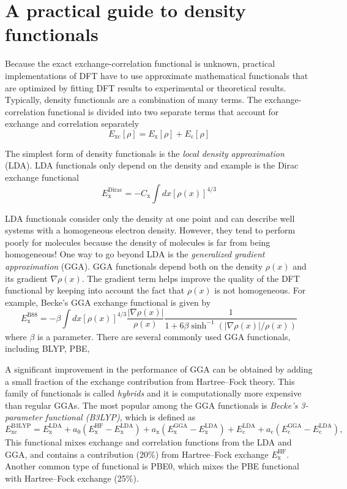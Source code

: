 \documentclass[../Main/notes.tex]{subfiles}
\begin{document}
\section{A practical guide to density functionals}

Because the exact exchange-correlation functional is unknown, practical implementations of DFT have to use approximate mathematical functionals that are optimized by fitting DFT results to experimental or theoretical results.
Typically, density functionals are a combination of many terms.
The exchange-correlation functional is divided into two separate terms that account for exchange and correlation separately
\begin{equation}
E_\mathrm{xc}[\rho] = E_\mathrm{x}[\rho] + E_\mathrm{c}[\rho]
\end{equation}

The simplest form of density functionals is the \emph{local density approximation} (LDA).
LDA functionals only depend on the density and example is the Dirac exchange functional
\begin{equation}
E_\mathrm{x}^\mathrm{Dirac} = - C_\mathrm{x} \int dx [\rho(x)]^{4/3}
\end{equation}

LDA functionals consider only the density at one point and can describe well systems with a homogeneous electron density.
However, they tend to perform poorly for molecules because the density of molecules is far from being homogeneous!
One way to go beyond LDA is the \emph{generalized gradient approximation} (GGA).
GGA functionals depend both on the density $\rho(x)$ and its gradient $\nabla \rho(x)$.
The gradient term helps improve the quality of the DFT functional by keeping into account the fact that $\rho(x)$ is not homogeneous.
For example, Becke's GGA exchange functional is given by
\begin{equation}
E_\mathrm{x}^\mathrm{B88} = - \beta \int dx [\rho(x)]^{4/3} \frac{|\nabla \rho(x)|}{\rho(x)} \frac{1}{1 + 6 \beta \sinh^{-1} (|\nabla \rho(x)|/\rho(x))}
\end{equation}
where $\beta$ is a parameter.
There are several commonly used GGA functionals, including BLYP, PBE, 

A significant improvement in the performance of GGA can be obtained by adding a small fraction of the exchange contribution from Hartree--Fock theory.
This family of functionals is called \emph{hybrids} and it is computationally more expensive than regular GGAs.
The most popular among the GGA functionals is \emph{Becke's 3-parameter functional (B3LYP)}, which is defined as
\begin{equation}
{\displaystyle E_{\text{xc}}^{\text{B3LYP}}=E_{\text{x}}^{\text{LDA}}+a_{0}(E_{\text{x}}^{\text{HF}}-E_{\text{x}}^{\text{LDA}})+a_{\text{x}}(E_{\text{x}}^{\text{GGA}}-E_{\text{x}}^{\text{LDA}})+E_{\text{c}}^{\text{LDA}}+a_{\text{c}}(E_{\text{c}}^{\text{GGA}}-E_{\text{c}}^{\text{LDA}}),}
\end{equation}
This functional mixes exchange and correlation functions from the LDA and GGA, and contains a contribution (20\%) from Hartree--Fock exchange $E_{\text{x}}^{\text{HF}}$.
Another common type of functional is PBE0, which mixes the PBE functional with Hartree--Fock exchange (25\%).
\end{document}
